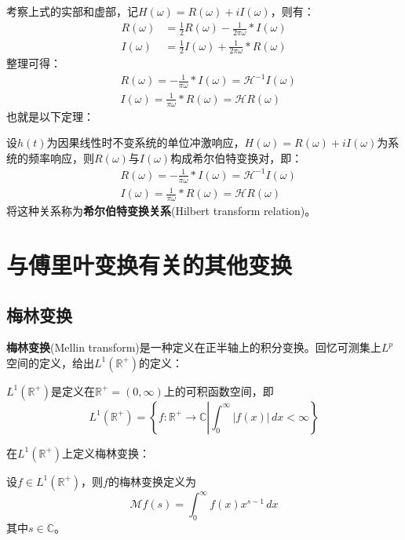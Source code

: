 \documentclass{ctexbook}
\begin{document}
考察上式的实部和虚部，记$H(\omega)=R(\omega)+iI(\omega)$，则有：
\begin{align*}
    R(\omega)&=\frac{1}{2}R(\omega)-\frac{1}{2\pi \omega}*I(\omega)\\
    I(\omega)&=\frac{1}{2}I(\omega)+\frac{1}{2\pi \omega}*R(\omega)
\end{align*}
整理可得：
\begin{align*}
    &R(\omega)=-\frac{1}{\pi \omega}*I(\omega)=\mathcal{H} ^{-1}I(\omega)\\
    &I(\omega)=\frac{1}{\pi \omega}*R(\omega)=\mathcal{H} R(\omega)
\end{align*}
也就是以下定理：
\begin{theorem}[希尔伯特变换关系]
    设$h(t)$为因果线性时不变系统的单位冲激响应，$H(\omega)=R(\omega)+iI(\omega)$为系统的频率响应，则$R(\omega)$与$I(\omega)$构成希尔伯特变换对，即：
    \begin{align*}
    &R(\omega)=-\frac{1}{\pi \omega}*I(\omega)=\mathcal{H} ^{-1}I(\omega)\\
    &I(\omega)=\frac{1}{\pi \omega}*R(\omega)=\mathcal{H} R(\omega)
\end{align*}
将这种关系称为\textbf{希尔伯特变换关系}(Hilbert transform relation)。
\end{theorem}

\section{与傅里叶变换有关的其他变换}\label{sec:Other_Transforms}

\subsection{梅林变换}\label{sub:mellin}

\textbf{梅林变换}(Mellin transform)是一种定义在正半轴上的积分变换。回忆可测集上$L^p$空间的定义，给出$L^1(\mathbb{R}^+)$的定义：
\begin{definition}
    $L^1(\mathbb{R}^+)$是定义在$\mathbb{R}^+=(0,\infty)$上的可积函数空间，即
    $$L^1(\mathbb{R}^+)=\left\{f:\mathbb{R}^+\to\mathbb{C}\left|\int_0^{\infty}|f(x)|\,dx<\infty\right.\right\}$$
\end{definition}

在$L^1(\mathbb{R}^+)$上定义梅林变换：

\begin{definition}[梅林变换]
    设$f\in L^1(\mathbb{R}^+)$，则$f$的梅林变换定义为
    \[\mathcal{M} f(s)=\int_0^{\infty}f(x)x^{s-1}\,dx\]
    其中$s\in\mathbb{C}$。    
\end{definition}
\end{document}
